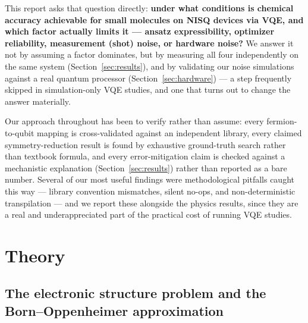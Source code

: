 \documentclass[11pt]{article}
\begin{document}
This report asks that question directly: \textbf{under what conditions is
chemical accuracy achievable for small molecules on NISQ devices via VQE, and
which factor actually limits it --- ansatz expressibility, optimizer
reliability, measurement (shot) noise, or hardware noise?} We answer it not by
assuming a factor dominates, but by measuring all four independently on the
same system (Section~\ref{sec:results}), and by validating our noise
simulations against a real quantum processor (Section~\ref{sec:hardware}) ---
a step frequently skipped in simulation-only VQE studies, and one that turns
out to change the answer materially.

Our approach throughout has been to verify rather than assume: every
fermion-to-qubit mapping is cross-validated against an independent library,
every claimed symmetry-reduction result is found by exhaustive ground-truth
search rather than textbook formula, and every error-mitigation claim is
checked against a mechanistic explanation (Section~\ref{sec:results}) rather
than reported as a bare number. Several of our most useful findings were
methodological pitfalls caught this way --- library convention mismatches,
silent no-ops, and non-deterministic transpilation --- and we report these
alongside the physics results, since they are a real and underappreciated part
of the practical cost of running VQE studies.

\section{Theory}
\label{sec:theory}

\subsection{The electronic structure problem and the Born--Oppenheimer approximation}
\end{document}
